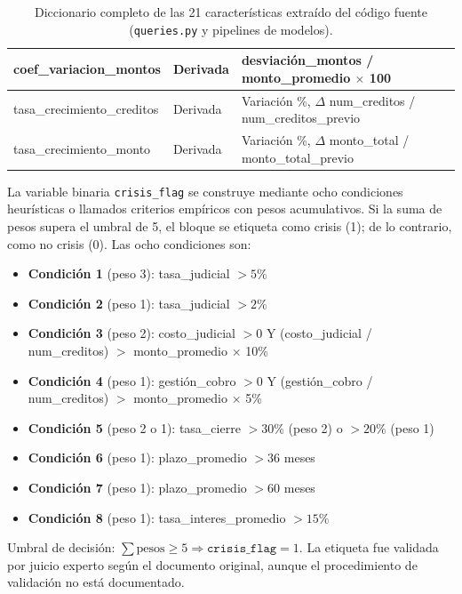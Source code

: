 \begin{table}[H]
\begin{tabular}{
        | >{\raggedright\arraybackslash}p{5.0cm}
        | >{\raggedright\arraybackslash}p{2.0cm}        
        | >{\raggedright\arraybackslash}p{7.5cm} |
        }
    \hline
        coef\_variacion\_montos & Derivada & desviación\_montos / monto\_promedio $\times$ 100 \\
    \hline
        tasa\_crecimiento\_creditos & Derivada & Variación \%, $\Delta$ num\_creditos / num\_creditos\_previo \\
    \hline
        tasa\_crecimiento\_monto & Derivada & Variación \%, $\Delta$ monto\_total / monto\_total\_previo \\
    \hline
    \end{tabular}
    \caption{Diccionario completo de las 21 características extraído del código fuente (\texttt{queries.py} y pipelines de modelos).}
    \label{tab:caracteristicas}
\end{table}

La variable binaria \texttt{crisis\_flag} se construye mediante ocho condiciones heurísticas o llamados criterios empíricos con pesos acumulativos. Si la suma de pesos supera el umbral de 5, el bloque se etiqueta como crisis (1); de lo contrario, como no crisis (0). Las ocho condiciones son:

\begin{itemize}
    \item \textbf{Condición 1} (peso 3): tasa\_judicial $> 5\%$
    \item \textbf{Condición 2} (peso 1): tasa\_judicial $> 2\%$
    \item \textbf{Condición 3} (peso 2): costo\_judicial $> 0$ Y (costo\_judicial / num\_creditos) $> $ monto\_promedio $\times$ 10\%
    \item \textbf{Condición 4} (peso 1): gestión\_cobro $> 0$ Y (gestión\_cobro / num\_creditos) $> $ monto\_promedio $\times$ 5\%
    \item \textbf{Condición 5} (peso 2 o 1): tasa\_cierre $> 30\%$ (peso 2) o $> 20\%$ (peso 1)
    \item \textbf{Condición 6} (peso 1): plazo\_promedio $> 36$ meses
    \item \textbf{Condición 7} (peso 1): plazo\_promedio $> 60$ meses
    \item \textbf{Condición 8} (peso 1): tasa\_interes\_promedio $> 15\%$
\end{itemize}

Umbral de decisión: $\sum \text{pesos} \geq 5 \Rightarrow \texttt{crisis\_flag} = 1$. La etiqueta fue validada por juicio experto según el documento original, aunque el procedimiento de validación no está documentado.\\

